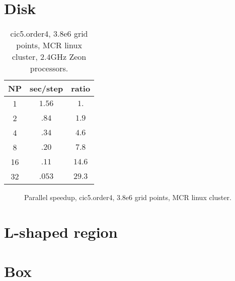 \documentclass[12pt]{article}
\begin{document}
\clearpage
\section{Disk}

\begin{table}[hbt]
\begin{center}\footnotesize
\begin{tabular}{|c|c|c|} \hline 
     NP       & sec/step   & ratio \\   \hline\hline 
     1        &  $1.56$    & $ 1. $   \\ 
     2        &  $.84 $    & $ 1.9 $   \\ 
     4        &  $.34 $    & $ 4.6 $   \\ 
     8        &  $.20 $    & $ 7.8 $   \\ 
    16        &  $.11 $    & $14.6 $   \\ 
    32        &  $.053$    & $29.3 $   \\ \hline 
\end{tabular}		
\end{center}		
\caption{cic5.order4, 3.8e6 grid points, MCR linux cluster, 2.4GHz Zeon processors.}
 \label{tab:box} 
\end{table}

\begin{figure}
\begin{center}
\end{center}
\caption{Parallel speedup, cic5.order4, 3.8e6 grid points, MCR linux cluster.}
\end{figure}

\clearpage
\section{L-shaped region}

\clearpage
\section{Box}
\end{document}
